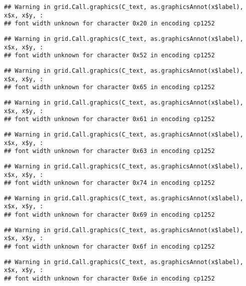 \documentclass[
]{article}
\begin{document}
\begin{verbatim}
## Warning in grid.Call.graphics(C_text, as.graphicsAnnot(x$label), x$x, x$y, :
## font width unknown for character 0x20 in encoding cp1252
\end{verbatim}

\begin{verbatim}
## Warning in grid.Call.graphics(C_text, as.graphicsAnnot(x$label), x$x, x$y, :
## font width unknown for character 0x52 in encoding cp1252
\end{verbatim}

\begin{verbatim}
## Warning in grid.Call.graphics(C_text, as.graphicsAnnot(x$label), x$x, x$y, :
## font width unknown for character 0x65 in encoding cp1252
\end{verbatim}

\begin{verbatim}
## Warning in grid.Call.graphics(C_text, as.graphicsAnnot(x$label), x$x, x$y, :
## font width unknown for character 0x61 in encoding cp1252
\end{verbatim}

\begin{verbatim}
## Warning in grid.Call.graphics(C_text, as.graphicsAnnot(x$label), x$x, x$y, :
## font width unknown for character 0x63 in encoding cp1252
\end{verbatim}

\begin{verbatim}
## Warning in grid.Call.graphics(C_text, as.graphicsAnnot(x$label), x$x, x$y, :
## font width unknown for character 0x74 in encoding cp1252
\end{verbatim}

\begin{verbatim}
## Warning in grid.Call.graphics(C_text, as.graphicsAnnot(x$label), x$x, x$y, :
## font width unknown for character 0x69 in encoding cp1252
\end{verbatim}

\begin{verbatim}
## Warning in grid.Call.graphics(C_text, as.graphicsAnnot(x$label), x$x, x$y, :
## font width unknown for character 0x6f in encoding cp1252
\end{verbatim}

\begin{verbatim}
## Warning in grid.Call.graphics(C_text, as.graphicsAnnot(x$label), x$x, x$y, :
## font width unknown for character 0x6e in encoding cp1252
\end{verbatim}
\end{document}
